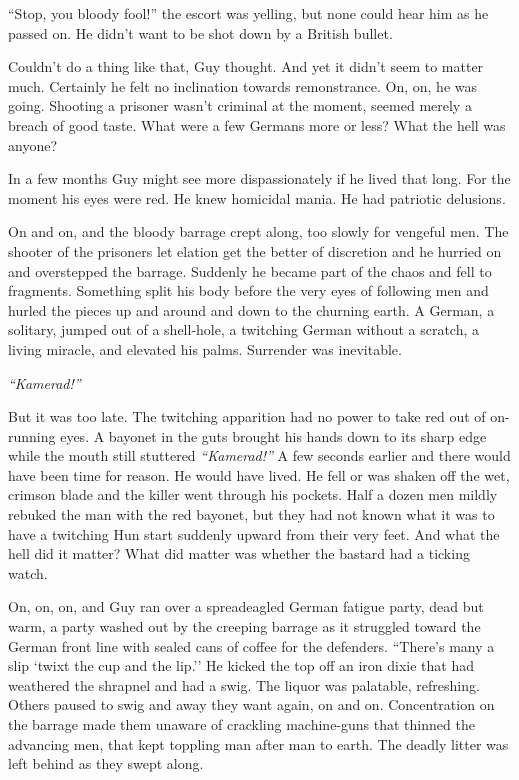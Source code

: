 ``Stop, you bloody fool!'' the escort was yelling, but none could hear him as he passed on. He didn't want to be shot down by a British bullet.

Couldn't do a thing like that, Guy thought. And yet it didn't seem to matter much. Certainly he felt no inclination towards remonstrance. On, on, he was going. Shooting a prisoner wasn't criminal at the moment, seemed merely a breach of good taste. What were a few Germans more or less? What the hell was anyone?

In a few months Guy might see more dispassionately if he lived that long. For the moment his eyes were red. He knew homicidal mania. He had patriotic delusions.

On and on, and the bloody barrage crept along, too slowly for vengeful men. The shooter of the prisoners let elation get the better of discretion and he hurried on and overstepped the barrage. Suddenly he became part of the chaos and fell to fragments. Something split his body before the very eyes of following men and hurled the pieces up and around and down to the churning earth. A German, a solitary, jumped out of a shell-hole, a twitching German without a scratch, a living miracle, and elevated his palms. Surrender was inevitable.

\emph{``Kamerad!''}

But it was too late. The twitching apparition had no power to take red out of on-running eyes. A bayonet in the guts brought his hands down to its sharp edge while the mouth still stuttered \emph{``Kamerad!''} A few seconds earlier and there would have been time for reason. He would have lived. He fell or was shaken off the wet, crimson blade and the killer went through his pockets. Half a dozen men mildly rebuked the man with the red bayonet, but they had not known what it was to have a twitching Hun start suddenly upward from their very feet. And what the hell did it matter? What did matter was whether the bastard had a ticking watch.

On, on, on, and Guy ran over a spreadeagled German fatigue party, dead but warm, a party washed out by the creeping barrage as it struggled toward the German front line with sealed cans of coffee for the defenders. ``There's many a slip `twixt the cup and the lip.'' He kicked the top off an iron dixie that had weathered the shrapnel and had a swig. The liquor was palatable, refreshing. Others paused to swig and away they want again, on and on. Concentration on the barrage made them unaware of crackling machine-guns that thinned the advancing men, that kept toppling man after man to earth. The deadly litter was left behind as they swept along.


